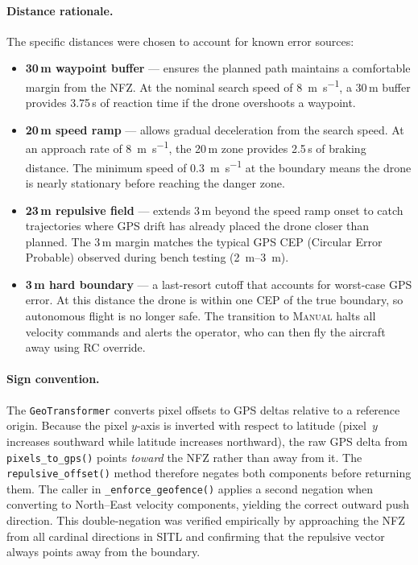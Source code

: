 \paragraph{Distance rationale.}
The specific distances were chosen to account for known error sources:

\begin{itemize}
  \item \textbf{30\,m waypoint buffer} --- ensures the planned path maintains a comfortable margin from the NFZ. At the nominal search speed of \SI{8}{\metre\per\second}, a 30\,m buffer provides 3.75\,s of reaction time if the drone overshoots a waypoint.
  \item \textbf{20\,m speed ramp} --- allows gradual deceleration from the search speed. At an approach rate of \SI{8}{\metre\per\second}, the 20\,m zone provides 2.5\,s of braking distance. The minimum speed of \SI{0.3}{\metre\per\second} at the boundary means the drone is nearly stationary before reaching the danger zone.
  \item \textbf{23\,m repulsive field} --- extends 3\,m beyond the speed ramp onset to catch trajectories where GPS drift has already placed the drone closer than planned. The 3\,m margin matches the typical GPS CEP (Circular Error Probable) observed during bench testing (\SIrange{2}{3}{\metre}).
  \item \textbf{3\,m hard boundary} --- a last-resort cutoff that accounts for worst-case GPS error. At this distance the drone is within one CEP of the true boundary, so autonomous flight is no longer safe. The transition to \textsc{Manual} halts all velocity commands and alerts the operator, who can then fly the aircraft away using RC override.
\end{itemize}

\paragraph{Sign convention.}\label{sec:sign-convention}
The \texttt{GeoTransformer} converts pixel offsets to GPS deltas relative to a reference origin. Because the pixel $y$-axis is inverted with respect to latitude (pixel~$y$ increases southward while latitude increases northward), the raw GPS delta from \texttt{pixels\_to\_gps()} points \emph{toward} the NFZ rather than away from it. The \texttt{repulsive\_offset()} method therefore negates both components before returning them. The caller in \texttt{\_enforce\_geofence()} applies a second negation when converting to North--East velocity components, yielding the correct outward push direction. This double-negation was verified empirically by approaching the NFZ from all cardinal directions in SITL and confirming that the repulsive vector always points away from the boundary.

